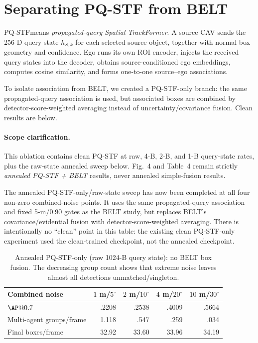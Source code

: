 \documentclass[11pt]{article}
\newcommand{\PQSTF}{\textsc{PQ-STF}}
\begin{document}
\section{Separating PQ-STF from BELT}

\PQSTF means \emph{propagated-query Spatial TrackFormer}. A source CAV sends the 256-D query state $h_{S,k}$ for each selected source object, together with normal box geometry and confidence. Ego runs its own ROI encoder, injects the received query states into the decoder, obtains source-conditioned ego embeddings, computes cosine similarity, and forms one-to-one source--ego associations.

To isolate association from BELT, we created a PQ-STF-only branch: the same propagated-query association is used, but associated boxes are combined by detector-score-weighted averaging instead of uncertainty/covariance fusion. Clean results are below.

\paragraph{Scope clarification.} This ablation contains clean PQ-STF at raw, 4-B, 2-B, and 1-B query-state rates, plus the raw-state annealed sweep below.  Fig.~4 and Table~4 remain strictly \emph{annealed PQ-STF + BELT} results, never annealed simple-fusion results.

The annealed PQ-STF-only/raw-state sweep has now been completed at all four non-zero combined-noise points.  It uses the same propagated-query association and fixed 5-m/0.90 gates as the BELT study, but replaces BELT's covariance/evidential fusion with detector-score-weighted averaging.  There is intentionally no ``clean'' point in this table: the existing clean PQ-STF-only experiment used the clean-trained checkpoint, not the annealed checkpoint.

\begin{table}[h]
\centering
\caption{Annealed PQ-STF-only (raw 1024-B query state): no BELT box fusion. The decreasing group count shows that extreme noise leaves almost all detections unmatched/singleton.}
\begin{tabular}{lrrrr}
\toprule
Combined noise & $1$ m/$5^\circ$ & $2$ m/$10^\circ$ & $4$ m/$20^\circ$ & $10$ m/$30^\circ$\\
\midrule
$\AP@0.7$ & .2208 & .2538 & .4009 & .5664\\
Multi-agent groups/frame & 1.118 & .547 & .259 & .034\\
Final boxes/frame & 32.92 & 33.60 & 33.96 & 34.19\\
\bottomrule
\end{tabular}
\end{table}
\end{document}
